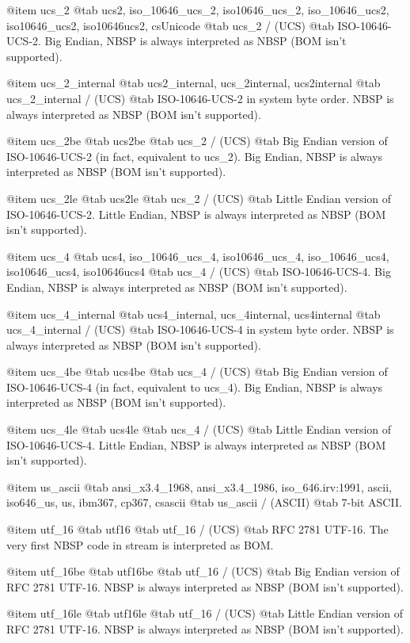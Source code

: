 @item
ucs_2
@tab
ucs2, iso_10646_ucs_2, iso10646_ucs_2, iso_10646_ucs2, iso10646_ucs2, iso10646ucs2, csUnicode
@tab
ucs_2 / (UCS)
@tab
ISO-10646-UCS-2. Big Endian, NBSP is always interpreted as NBSP (BOM isn't supported).


@item
ucs_2_internal
@tab
ucs2_internal, ucs_2internal, ucs2internal
@tab
ucs_2_internal / (UCS)
@tab
ISO-10646-UCS-2 in system byte order.
NBSP is always interpreted as NBSP (BOM isn't supported).


@item
ucs_2be
@tab
ucs2be
@tab
ucs_2 / (UCS)
@tab
Big Endian version of ISO-10646-UCS-2 (in fact, equivalent to ucs_2).
Big Endian, NBSP is always interpreted as NBSP (BOM isn't supported).


@item
ucs_2le
@tab
ucs2le
@tab
ucs_2 / (UCS)
@tab
Little Endian version of ISO-10646-UCS-2.
Little Endian, NBSP is always interpreted as NBSP (BOM isn't supported).


@item
ucs_4
@tab
ucs4, iso_10646_ucs_4, iso10646_ucs_4, iso_10646_ucs4, iso10646_ucs4, iso10646ucs4
@tab
ucs_4 / (UCS)
@tab
ISO-10646-UCS-4. Big Endian, NBSP is always interpreted as NBSP (BOM isn't supported).


@item
ucs_4_internal
@tab
ucs4_internal, ucs_4internal, ucs4internal
@tab
ucs_4_internal / (UCS)
@tab
ISO-10646-UCS-4 in system byte order.
NBSP is always interpreted as NBSP (BOM isn't supported).


@item
ucs_4be
@tab
ucs4be
@tab
ucs_4 / (UCS)
@tab
Big Endian version of ISO-10646-UCS-4 (in fact, equivalent to ucs_4).
Big Endian, NBSP is always interpreted as NBSP (BOM isn't supported).


@item
ucs_4le
@tab
ucs4le
@tab
ucs_4 / (UCS)
@tab
Little Endian version of ISO-10646-UCS-4.
Little Endian, NBSP is always interpreted as NBSP (BOM isn't supported).


@item
us_ascii
@tab
ansi_x3.4_1968, ansi_x3.4_1986, iso_646.irv:1991, ascii, iso646_us, us, ibm367, cp367, csascii
@tab
us_ascii / (ASCII)
@tab
7-bit ASCII.


@item
utf_16
@tab
utf16
@tab
utf_16 / (UCS)
@tab
RFC 2781 UTF-16. The very first NBSP code in stream is interpreted as BOM.


@item
utf_16be
@tab
utf16be
@tab
utf_16 / (UCS)
@tab
Big Endian version of RFC 2781 UTF-16.
NBSP is always interpreted as NBSP (BOM isn't supported).


@item
utf_16le
@tab
utf16le
@tab
utf_16 / (UCS)
@tab
Little Endian version of RFC 2781 UTF-16.
NBSP is always interpreted as NBSP (BOM isn't supported).


